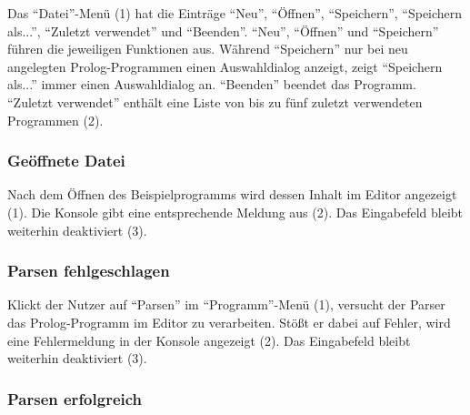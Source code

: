 \documentclass[parskip=full,11pt,twoside]{scrartcl}
\begin{document}
Das \enquote{Datei}-Menü (1) hat die Einträge \enquote{Neu}, \enquote{Öffnen}, \enquote{Speichern}, \enquote{Speichern als...}, \enquote{Zuletzt verwendet} und \enquote{Beenden}.
\enquote{Neu}, \enquote{Öffnen} und \enquote{Speichern} führen die jeweiligen Funktionen aus.
Während \enquote{Speichern} nur bei neu angelegten Prolog-Programmen einen Auswahldialog anzeigt, zeigt \enquote{Speichern als...} immer einen Auswahldialog an.
\enquote{Beenden} beendet das Programm.
\enquote{Zuletzt verwendet} enthält eine Liste von bis zu fünf zuletzt verwendeten Programmen (2).

\subsubsection{Geöffnete Datei}

\begin{minipage}{\linewidth}
\end{minipage}

Nach dem Öffnen des Beispielprogramms wird dessen Inhalt im Editor angezeigt (1).
Die Konsole gibt eine entsprechende Meldung aus (2).
Das Eingabefeld bleibt weiterhin deaktiviert (3).

\subsubsection{Parsen fehlgeschlagen}

\begin{minipage}{\linewidth}
\end{minipage}

Klickt der Nutzer auf \enquote{Parsen} im \enquote{Programm}-Menü (1), versucht der Parser das Prolog-Programm im Editor zu verarbeiten.
Stößt er dabei auf Fehler, wird eine Fehlermeldung in der Konsole angezeigt (2).
Das Eingabefeld bleibt weiterhin deaktiviert (3).

\subsubsection{Parsen erfolgreich}

\begin{minipage}{\linewidth}
\end{minipage}
\end{document}
